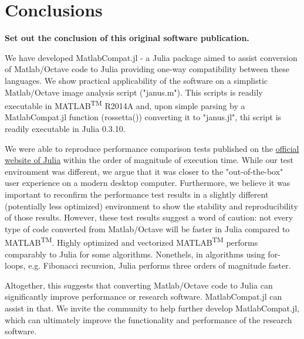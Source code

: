 \section{Conclusions}

\textbf{Set out the conclusion of this original software publication.}

We have developed MatlabCompat.jl - a Julia package aimed to assist conversion of Matlab/Octave code to Julia providing one-way compatibility between these languages. We show practical applicability of the software on a simplistic Matlab/Octave image analysis script ("janus.m"). This scripts is readily executable in MATLAB\textsuperscript{TM} R2014A and, upon simple parsing by a MatlabCompat.jl function (rossetta()) converting it to "janus.jl", thi script is readily executable in Julia 0.3.10.

We were able to reproduce performance comparison tests published on the \href{http://julialang.org/benchmarks/}{official website of Julia} within the order of magnitude of execution time. While our test environment was different, we argue that it was closer to the "out-of-the-box" user experience on a modern desktop computer. Furthermore, we believe it was important to reconfirm the performance test results in a slightly different (potentially less optimized) environment to show the stability and reproducibility of those results. However, these test results suggest a word of caution: not every type of code converted from Matlab/Octave will be faster in Julia compared to MATLAB\textsuperscript{TM}. Highly optimized and vectorized MATLAB\textsuperscript{TM} performs comparably to Julia for some algorithms. Nonethels, in algorithms using for-loops, e.g. Fibonacci recursion, Julia performs three orders of magnitude faster.

Altogether, this suggests that converting Matlab/Octave code to Julia can significantly improve performance or research software. MatlabCompat.jl can assist in that. We invite the community to help further develop MatlabCompat.jl, which can ultimately improve the functionality and performance of the research software.